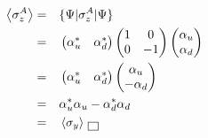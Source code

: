 \documentclass[solutions.tex]{subfiles}
\begin{document}
\begin{equation*}\begin{aligned}
	\left\langle \sigma_z^A \right\rangle &=&& \{\Psi|\sigma_z^A|\Psi\} \\
	~ &=&& \begin{pmatrix} \alpha_u^* & \alpha_d^* \\ \end{pmatrix}
		\begin{pmatrix}
			1 & 0 \\
			0 & -1 \\
		\end{pmatrix}\begin{pmatrix}
			\alpha_u \\
			\alpha_d \\
		\end{pmatrix} \\
	~ &=&& \begin{pmatrix} \alpha_u^* & \alpha_d^* \\ \end{pmatrix}
		\begin{pmatrix}
			\alpha_u \\
			-\alpha_d \\
		\end{pmatrix} \\
	~ &=&& \alpha_u^*\alpha_u - \alpha_d^*\alpha_d \\
	~ &=&& \left\langle \sigma_y \right\rangle \,\boxed{\,}
\end{aligned}\end{equation*}
\end{document}
